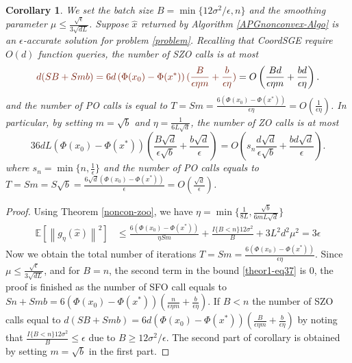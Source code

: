 \documentclass{article}
\newcommand*{\E}{\mathbb{E}}
\newcommand{\norm}[1]{\left\lVert#1\right\rVert}
\newtheorem{corollary}[theorem]{Corollary}
\theoremstyle{definition}
\theoremstyle{remark}
\begin{document}
 \begin{corollary}\label{corr11}
We set the batch size $B = \min\{12\sigma^2/\epsilon, n\}$ and the smoothing parameter $\mu \leq \frac{\sqrt{\epsilon}}{3\sqrt{dL}}$. Suppose $\hat{x}$ returned by Algorithm \ref{APGnonconvex-Algo}  is an $\epsilon$-accurate solution for problem \eqref{problem}. Recalling that CoordSGE require $O(d)$ function queries, the number of SZO calls is at most 
\begin{equation}\label{SZO-call-nocon}
{\color{Brown}d(SB+Smb) = 6d \left(\Phi(x_0) - \Phi({x}^*)\right) (\frac{B}{\epsilon\eta m}+\frac{b}{\epsilon\eta})} = O\left(\frac{Bd}{\epsilon\eta m}+\frac{bd}{\epsilon\eta}\right).
\end{equation} 
and the number of PO calls is equal to $T = Sm = \frac{6\left(\Phi(x_0) - \Phi({x}^*)\right)}{\epsilon\eta} = O\left(\frac{1}{\epsilon\eta}\right)$. In particular, by setting $m=\sqrt{b}$ and {\color{Brown}$\eta = \frac{1}{6L\sqrt{d}}$}, the number of ZO calls is at most 
\begin{equation}\label{SZO-call-par-nocon}
36d L (\Phi(x_0)-\Phi(x^*))\left(\frac{B\sqrt{d}}{\epsilon\sqrt{b}}+\frac{b\sqrt{d}}{\epsilon}\right) = O\left(s_n\frac{d\sqrt{d}}{\epsilon \sqrt{b}}+\frac{bd\sqrt{d}}{\epsilon}\right).
\end{equation}
where $s_n = \min\{n,\frac{1}{\epsilon}\}$ and the number of PO calls equals to $T = Sm = S\sqrt{b} = \frac{6\sqrt{d}\left(\Phi(x_0) - \Phi({x}^*)\right)}{\epsilon} = O\left(\frac{\sqrt{d}}{\epsilon}\right)$. 
\end{corollary}
\begin{proof}
Using Theorem \ref{noncon-zoo}, we have $\eta = \min\{\frac{1}{8L}, \frac{\sqrt{b}}{6mL\sqrt{d}}\}$
\begin{align}
\E[\norm{g_{\eta}(\hat{x})}^2] & \leq \frac{6\left(\Phi(x_0) - \Phi({x}^*)\right)}{\eta Sm} + \frac{I\{B < n\}12 \sigma ^2}{B}+3{L^2 d^2 \mu^2} = 3\epsilon\label{theor1-eq37}
 \end{align} 
 Now we obtain the total number of iterations  {\color{Brown} $T = Sm = \frac{6\left(\Phi(x_0) - \Phi({x}^*)\right)}{\epsilon\eta}$}. Since $\mu \leq \frac{\sqrt{\epsilon}}{3\sqrt{dL}}$, and for $B = n$, the second term in the bound \eqref{theor1-eq37} is $0$, the proof is finished as the number of SFO call equals to {\color{Brown}$Sn+Smb = 6 \left(\Phi(x_0) - \Phi({x}^*)\right) (\frac{n}{\epsilon\eta m}+\frac{b}{\epsilon\eta})$}. If  $B < n$ the number of SZO calls equal to  {\color{Brown}$d(SB+Smb) = 6d \left(\Phi(x_0) - \Phi({x}^*)\right) (\frac{B}{\epsilon\eta m}+\frac{b}{\epsilon\eta})$} by noting that $\frac{I\{B < n\}12\sigma^2}{B} \leq \epsilon$ due to $B \geq 12\sigma^2 /\epsilon$. The second part of corollary is obtained by setting $m = \sqrt{b}$ in the first part.
\end{proof}
\end{document}
